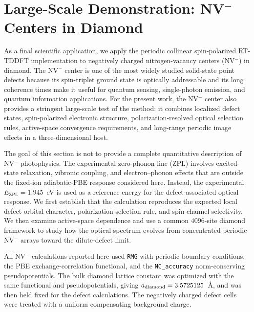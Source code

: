 \section[Large-Scale Demonstration: NV- Centers in Diamond]{Large-Scale Demonstration: NV$^{-}$ Centers in Diamond}
\label{sec:nv}

As a final scientific application, we apply the periodic collinear
spin-polarized RT-TDDFT implementation to negatively charged
nitrogen-vacancy centers (NV$^{-}$) in diamond.  The NV$^{-}$ center is
one of the most widely studied solid-state point defects because its
spin-triplet ground state is optically addressable and its long
coherence times make it useful for quantum sensing, single-photon
emission, and quantum information
applications.\cite{NV-Doherty-2013,NV-Gali-2008,NV-Gali-2019,NV-coherence-Balasubramanian-2009,NV-sensing-Degen-2017,NV-sensing-Maze-2008,NV-sensing-Schirhagl-2014,NV-spe-Aharonovich-2016,NV-QComp-Bradley-2019}
For the present work, the NV$^{-}$ center also provides a stringent
large-scale test of the method: it combines localized defect states,
spin-polarized electronic structure, polarization-resolved optical
selection rules, active-space convergence requirements, and long-range
periodic image effects in a three-dimensional
host.\cite{NV-Gali-2008,NV-Gali-2019,NV-Louie-2012}

The goal of this section is not to provide a complete quantitative
description of NV$^{-}$ photophysics.  The experimental zero-phonon
line (ZPL) involves excited-state relaxation, vibronic coupling, and
electron--phonon effects that are outside the fixed-ion adiabatic-PBE
response considered here.\cite{NV-Doherty-2013,NV-Gali-2019}
Instead, the experimental $E_{\mathrm{ZPL}}=1.945$~eV is used as a
reference energy for the defect-associated optical
response.\cite{Davies-Hamer-NV-ZPL-1976,NV-Doherty-2013}
We first establish that the calculation reproduces the expected local
defect orbital character, polarization selection rule, and spin-channel
selectivity.  We then examine active-space dependence and use a common
4096-site diamond framework to study how the optical spectrum evolves
from concentrated periodic NV$^{-}$ arrays toward the dilute-defect
limit.

All NV$^{-}$ calculations reported here used \texttt{RMG} with
periodic boundary conditions, the PBE exchange-correlation functional,
and the \texttt{NC\_accuracy} norm-conserving pseudopotentials.  The
bulk diamond lattice constant was optimized with the same functional
and pseudopotentials, giving $a_{\rm diamond}=3.5725125$~\AA, and was
then held fixed for the defect calculations.  The negatively charged
defect cells were treated with a uniform compensating background
charge.

